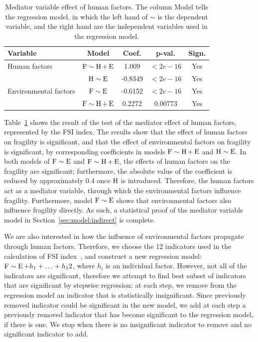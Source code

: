 {\begin{table}[htbp]
    \centering
    \begin{tabular}{|l|cccc|} \hline
        Variable & Model & Coef. & p-val. & Sign.  \\ \hline
        Human factors & $\operatorname*{F}\sim\operatorname*{{H}} + \operatorname*{E}$ & 1.009 & $<2e-16$ & Yes  \\ \hline        
        \multirow{3}{*}{Environmental factors} & $\operatorname*{{H}}\sim\operatorname*{E}$ & -0.8349 & $<2e-16$ & Yes \\ \cline{2-5}
        & $\operatorname*{F}\sim\operatorname*{E}$ & -0.6152 & $<2e-16$ & Yes \\ \cline{2-5}
        & $\operatorname*{F}\sim\operatorname*{{H}}+\operatorname*{E}$ & 0.2272 & 0.00773 & Yes \\ \hline        
    \end{tabular}
    \caption{Mediator variable effect of human factors. The column Model tells the regression model, in which the left hand of $\sim$ is the dependent variable, and the right hand are the independent variables used in the regression model.}
    \label{tab:exp:mediator:general}
\end{table}
    
Table~\ref{tab:exp:mediator:general} shows the result of the test of the mediator effect of human factors, represented by the FSI index. The results show that the effect of human factors on fragility is significant, and that the effect of environmental factors on fragility is significant, by corresponding coefficients in models $\operatorname*{F}\sim\operatorname*{{H}}+\operatorname*{E}$ and $\operatorname*{{H}}\sim\operatorname*{E}$. In both models of $\operatorname*{F}\sim\operatorname*{E}$ and $\operatorname*{F}\sim\operatorname*{{H}}+\operatorname*{E}$, the effects of human factors on the fragility are significant; furthermore, the absolute value of the coefficient is reduced by approximately $0.4$ once $\operatorname*{{H}}$ is introduced. Therefore, the human factors act as a mediator variable, through which the environmental factors influence fragility. Furthermore, model $\operatorname*{F}\sim\operatorname*{E}$ shows that environmental factors also influence fragility directly. As such, a statistical proof of the mediator variable model in Section~\ref{sec:model:indirect} is complete.

We are also interested in how the influence of environmental factors propagate through human factors. Therefore, we choose the 12 indicators used in the calculation of FSI index~\cite{FSI_index}, and construct a new regression model: $\operatorname*{F}\sim\operatorname*{E}+h_1+\ldots+h_12$, where $h_i$ is an individual factor. However, not all of the indicators are significant, therefore we attempt to find best subset of indicators that are significant by stepwise regression: at each step, we remove from the regression model an indicator that is statistically insignificant. Since previously removed indicator could be significant in the new model, we add at each step a previously removed indicator that has become significant to the regression model, if there is one. We stop when there is no insignificant indicator to remove and no significant indicator to add. 

}
